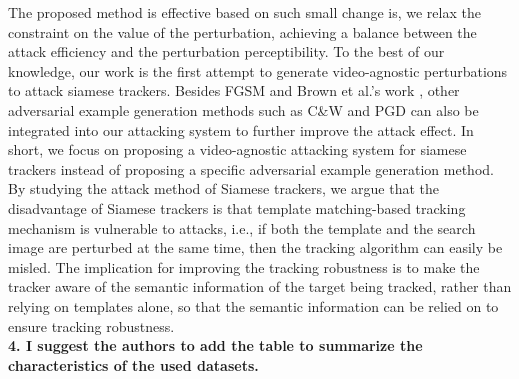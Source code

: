 \documentclass[12pt]{article}
\begin{document}
The proposed method is effective based on such small change is, we relax the constraint on the value of the perturbation, achieving a balance between the attack efficiency and the perturbation perceptibility.
To the best of our knowledge, our work is the first attempt to generate video-agnostic perturbations to attack siamese trackers. Besides FGSM \cite{FGSM} and Brown et al.'s work \cite{patch}, other adversarial example generation methods such as C\&W \cite{carlini2017towards} and PGD \cite{PGD} can also be integrated into our attacking system to further improve the attack effect.
In short, we focus on proposing a video-agnostic attacking system for siamese trackers instead of proposing a specific adversarial example generation method.
By studying the attack method of Siamese trackers, we argue that the disadvantage of Siamese trackers is that template matching-based tracking mechanism is vulnerable to attacks, i.e., if both the template and the search image are perturbed at the same time, then the tracking algorithm can easily be misled.
The implication for improving the tracking robustness is to make the tracker aware of the semantic information of the target being tracked, rather than relying on templates alone, so that the semantic information can be relied on to ensure tracking robustness.
\\[6pt]
\noindent \textbf{4. I suggest the authors to add the table to summarize the characteristics of the used datasets.}
\end{document}

